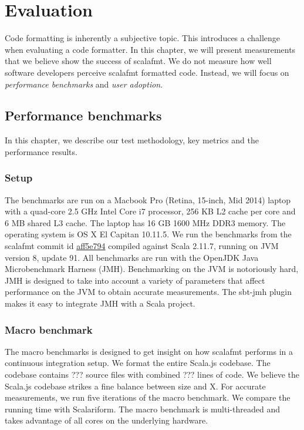 \section{Evaluation}
Code formatting is inherently a subjective topic.
This introduces a challenge when evaluating a code formatter.
In this chapter, we will present measurements that we believe show the success of scalafmt.
We do not measure how well software developers perceive scalafmt formatted code.
Instead, we will focus on \emph{performance benchmarks} and \emph{user adoption}.

\subsection{Performance benchmarks}
In this chapter, we describe our test methodology, key metrics and the performance results.

\subsubsection{Setup}
The benchmarks are run on a Macbook Pro (Retina, 15-inch, Mid 2014) laptop with a quad-core 2.5 GHz Intel Core i7 processor, 256 KB L2 cache per core and 6 MB shared L3 cache.
The laptop has 16 GB 1600 MHz DDR3 memory.
The operating system is OS X El Capitan 10.11.5.
We run the benchmarks from the scalafmt commit id \href{https://github.com/olafurpg/scalafmt/tree/aff5e794dae4787b08243f8abb87a3ca4d907e40}{aff5e794} compiled against Scala 2.11.7, running on JVM version 8, update 91.
All benchmarks are run with the OpenJDK Java Microbenchmark Harness (JMH)\autocite{OpenJ38:online}.
Benchmarking on the JVM is notoriously hard, JMH is designed to take into account a variety of parameters that affect performance on the JVM to obtain accurate measurements.
The sbt-jmh\autocite{ktoso84:online} plugin makes it easy to integrate JMH with a Scala project.

\subsubsection{Macro benchmark}
The macro benchmarks is designed to get insight on how scalafmt performs in a continuous integration setup.
We format the entire Scala.js codebase.
The codebase contains ??? source files with combined ??? lines of code.
We believe the Scala.js codebase strikes a fine balance between size and X.
For accurate measurements, we run five iterations of the macro benchmark.
We compare the running time with Scalariform.
The macro benchmark is multi-threaded and takes advantage of all cores on the underlying hardware.

